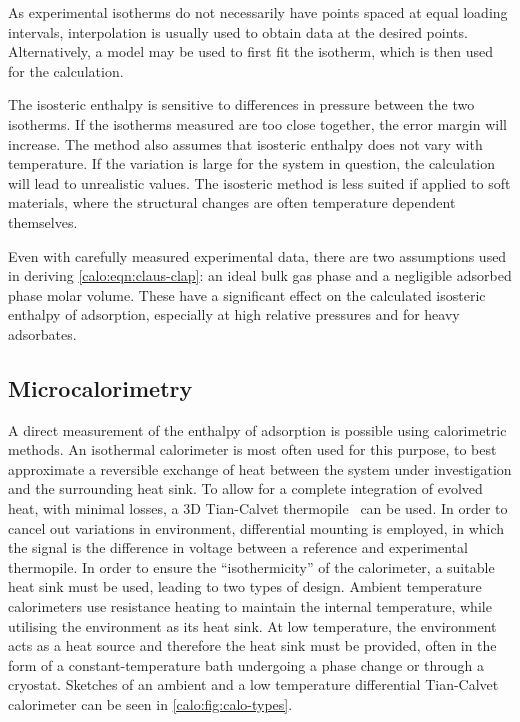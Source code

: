 As experimental isotherms do not necessarily have points spaced
at equal loading intervals, interpolation is usually used to obtain
data at the desired points. Alternatively, a model may be used
to first fit the isotherm, which is then used for the calculation.

The isosteric enthalpy is sensitive to differences in pressure between
the two isotherms. If the isotherms measured are too close together,
the error margin will increase. The method also assumes that isosteric
enthalpy does not vary with temperature. If the
variation is large for the system in question, the calculation will
lead to unrealistic values. The isosteric method is less suited
if applied to soft materials, where the structural changes are
often temperature dependent themselves.

Even with carefully measured experimental data, there are two
assumptions used in deriving \autoref{calo:eqn:claus-clap}:
an ideal bulk gas phase and a negligible adsorbed phase
molar volume. These have a significant effect on the calculated
isosteric enthalpy of adsorption, especially at high relative pressures
and for heavy adsorbates.

\subsection{Microcalorimetry}\label{calo:method:calo}

A direct measurement of the enthalpy of adsorption is possible using
calorimetric methods.
An isothermal calorimeter is most often used for this purpose,
to best approximate a reversible exchange of heat between the
system under investigation and the surrounding
heat sink. To allow for a complete integration of evolved heat,
with minimal losses, a 3D Tian-Calvet thermopile~\cite{calvetRecentProgressMicrocalorimetry1963}
can be used. In order to cancel out variations in environment,
differential mounting is employed, in which the signal
is the difference in voltage between a reference and experimental
thermopile. In order to ensure the ``isothermicity'' of the calorimeter, a
suitable heat sink must be used, leading to two types of design.
Ambient temperature calorimeters use resistance heating to
maintain the internal temperature, while utilising the environment
as its heat sink. At low temperature, the
environment acts as a heat source and therefore the heat sink must
be provided, often in the form of a constant-temperature bath
undergoing a phase change or through a cryostat. Sketches of
an ambient and a low temperature differential Tian-Calvet calorimeter
can be seen in \autoref{calo:fig:calo-types}.

